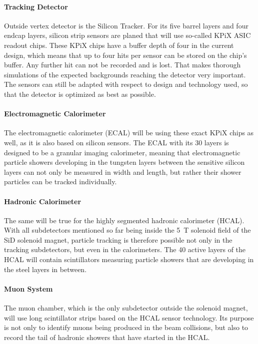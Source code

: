 \paragraph{Tracking Detector}
Outside vertex detector is the Silicon Tracker.
For its five barrel layers and four endcap layers, silicon strip sensors are planed that will use so-called KPiX ASIC readout chips.
These KPiX chips have a buffer depth of four in the current design, which means that up to four hits per sensor can be stored on the chip's buffer.
Any further hit can not be recorded and is lost.
That makes thorough simulations of the expected backgrounds reaching the detector very important.
The sensors can still be adapted with respect to design and technology used, so that the detector is optimized as best as possible.
\paragraph{Electromagnetic Calorimeter}
The electromagnetic calorimeter (ECAL) will be using these exact KPiX chips as well, as it is also based on silicon sensors.
The ECAL with its 30 layers is designed to be a granular imaging calorimeter, meaning that electromagnetic particle showers developing in the tungsten layers between the sensitive silicon layers can not only be measured in width and length, but rather their shower particles can be tracked individually.
\paragraph{Hadronic Calorimeter}
The same will be true for the highly segmented hadronic calorimeter (HCAL).
With all subdetectors mentioned so far being inside the \SI{5}{\tesla} solenoid field of the SiD solenoid magnet, particle tracking is therefore possible not only in the tracking subdetectors, but even in the calorimeters.
The 40 active layers of the HCAL will contain scintillators measuring particle showers that are developing in the steel layers in between.
\paragraph{Muon System}
The muon chamber, which is the only subdetector outside the solenoid magnet, will use long scintillator strips based on the HCAL sensor technology.
Its purpose is not only to identify muons being produced in the beam collisions, but also to record the tail of hadronic showers that have started in the HCAL.

